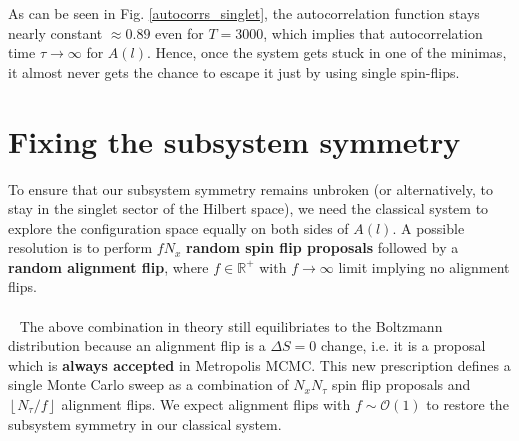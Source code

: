 \documentclass[../journal_main.tex]{subfiles}
\begin{document}
As can be seen in Fig. \ref{autocorrs_singlet}, the autocorrelation function stays nearly constant $\approx 0.89$ even for $T = 3000$, which implies that autocorrelation time $\boxed{\tau \to \infty}$ for $A(l)$. Hence, once the system gets stuck in one of the minimas, it almost never gets the chance to escape it just by using single spin-flips. 

\section{Fixing the subsystem symmetry}
To ensure that our subsystem symmetry remains unbroken (or alternatively, to stay in the singlet sector of the Hilbert space), we need the classical system to explore the configuration space equally on both sides of $A(l)$. A possible resolution is to perform ${f N_x}$  \textbf{random spin flip proposals} followed by a \textbf{random alignment flip}, where $f \in \mathbb{R}^+$ with $f \to \infty$ limit implying no alignment flips.\\~\\~
The above combination in theory still equilibriates to the Boltzmann distribution because an alignment flip is a $\Delta S = 0$ change, i.e. it is a proposal which is \textbf{always accepted} in Metropolis MCMC. This new prescription defines a single Monte Carlo sweep as a combination of $N_x N_\tau$ spin flip proposals and $\left\lfloor N_\tau/f \right\rfloor$ alignment flips. We expect alignment flips with $f \sim \mathcal{O}(1)$ to restore the subsystem symmetry in our classical system.
\end{document}
